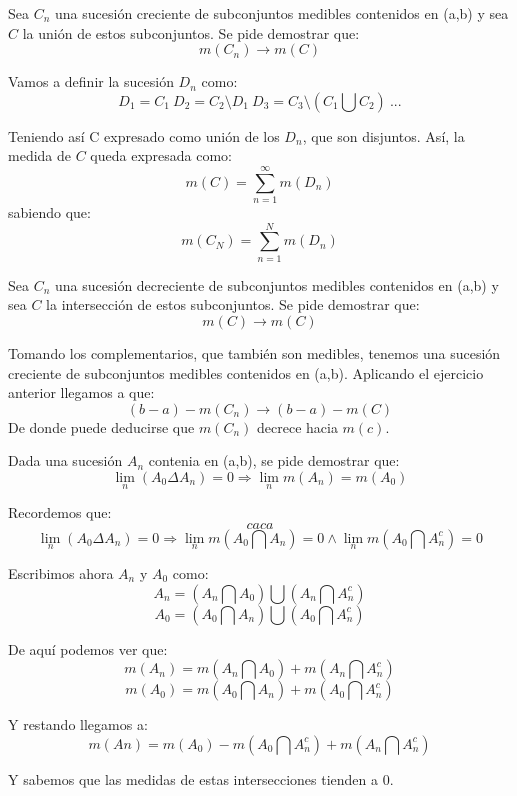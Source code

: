 \begin{problem}[11/10]
Sea $C_n$ una sucesión creciente de subconjuntos medibles contenidos en (a,b) y sea $C$ la unión de estos subconjuntos. Se pide demostrar que:
\[m(C_n) \rightarrow m(C)\]

\solution
Vamos a definir la sucesión $D_n$ como:
\[D_1=C_1 \ D_2 = C_2 \setminus D_1 \ D_3 = C_3 \setminus (C_1 \bigcup C_2) \ ...\]

Teniendo así C expresado como unión de los $D_n$, que son disjuntos. Así, la medida de $C$ queda expresada como:
\[m(C)=\sum_{n=1}^{\infty}m(D_n)\]
sabiendo que:
\[m(C_N)=\sum_{n=1}^{N}m(D_n)\]
\end{problem}

\begin{problem}[12/11]
Sea $C_n$ una sucesión decreciente de subconjuntos medibles contenidos en (a,b) y sea $C$ la intersección de estos subconjuntos. Se pide demostrar que:
\[m(C) \rightarrow m(C)\]
\solution

Tomando los complementarios, que también son medibles, tenemos una sucesión creciente de subconjuntos medibles contenidos en (a,b). Aplicando el ejercicio anterior llegamos a que:
\[(b-a)-m(C_n) \rightarrow (b-a)-m(C)\]
De donde puede deducirse que $m(C_n)$ decrece hacia $m(c)$.
\end{problem}

\begin{problem}[13/14]
Dada una sucesión $A_n$ contenia en (a,b), se pide demostrar que:
\[\lim_n(A_0\Delta A_n)=0 \Rightarrow \lim_n m(A_n)=m(A_0) \]

Recordemos que:
\[caca\]
\solution
\[\lim_n(A_0\Delta A_n)=0 \Rightarrow \lim_n m(A_0 \bigcap A_n)=0 \wedge \lim_n m(A_0\bigcap A_n^c)=0\]

Escribimos ahora $A_n$ y $A_0$ como:
\[A_n = (A_n \bigcap A_0) \bigcup (A_n \bigcap A_n^c)\]
\[A_0 = (A_0 \bigcap A_n) \bigcup (A_0 \bigcap A_n^c)\]

De aquí podemos ver que:
\[m(A_n) = m(A_n \bigcap A_0) + m(A_n \bigcap A_n^c)\]
\[m(A_0) = m(A_0 \bigcap A_n) + m(A_0 \bigcap A_n^c)\]

Y restando llegamos a:
\[m(An) = m(A_0) -m(A_0 \bigcap A_n^c) + m(A_n \bigcap A_n^c)\]

Y sabemos que las medidas de estas intersecciones tienden a 0.
\end{problem}